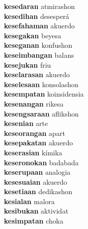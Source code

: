 \textbf{kesedaran } atmirashon \\
\textbf{kesedihan } desesperá \\
\textbf{kesefahaman } akuerdo \\
\textbf{kesegakan } beyesa \\
\textbf{keseganan } konfushon \\
\textbf{keseimbangan } balans \\
\textbf{kesejukan } friu \\
\textbf{keselarasan } akuerdo \\
\textbf{keselesaan } konsolashon \\
\textbf{kesempatan } koinsidensia \\
\textbf{kesenangan } rikesa \\
\textbf{kesengsaraan } aflikshon \\
\textbf{kesenian } arte \\
\textbf{keseorangan } apart \\
\textbf{kesepakatan } akuerdo \\
\textbf{keserasian } kímika \\
\textbf{keseronokan } badabada \\
\textbf{keserupaan } analogia \\
\textbf{kesesuaian } akuerdo \\
\textbf{kesetiaan } dedikashon \\
\textbf{kesialan } malora \\
\textbf{kesibukan } aktividat \\
\textbf{kesimpatan } choka \\
